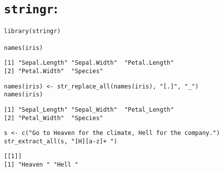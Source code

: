\documentclass[12pt]{article}
\begin{document}
\section{\texttt{stringr}: }

\begin{framed}
\begin{verbatim}
library(stringr)
 
names(iris)
\end{verbatim}
\end{framed}
\begin{verbatim}
[1] "Sepal.Length" "Sepal.Width"  "Petal.Length" 
[2] "Petal.Width"  "Species"
\end{verbatim}

\begin{framed}
\begin{verbatim}
names(iris) <- str_replace_all(names(iris), "[.]", "_")
names(iris)
\end{verbatim}
\end{framed}
\begin{verbatim}
[1] "Sepal_Length" "Sepal_Width"  "Petal_Length" 
[2] "Petal_Width"  "Species"
\end{verbatim}
\begin{framed}
\begin{verbatim} 
s <- c("Go to Heaven for the climate, Hell for the company.")
str_extract_all(s, "[H][a-z]+ ")
\end{verbatim}
\end{framed}
\begin{verbatim}
[[1]]
[1] "Heaven " "Hell "  
\end{verbatim}
\end{document}
